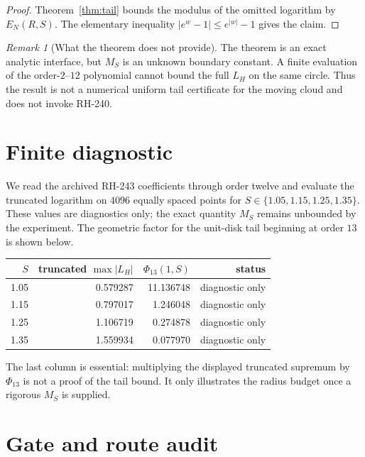 \documentclass[11pt]{article}
\theoremstyle{definition}
\theoremstyle{remark}
\newtheorem{remark}[theorem]{Remark}
\begin{document}
\begin{proof}
Theorem~\ref{thm:tail} bounds the modulus of the omitted logarithm by
$E_N(R,S)$.  The elementary inequality $|e^w-1|\le e^{|w|}-1$ gives the
claim.
\end{proof}

\begin{remark}[What the theorem does not provide]
The theorem is an exact analytic interface, but $M_S$ is an unknown boundary
constant.  A finite evaluation of the order-$2$--$12$ polynomial cannot bound
the full $L_H$ on the same circle.  Thus the result is not a numerical
uniform tail certificate for the moving cloud and does not invoke RH-240.
\end{remark}

\section{Finite diagnostic}

We read the archived RH-243 coefficients through order twelve and evaluate
the truncated logarithm on $4096$ equally spaced points for
$S\in\{1.05,1.15,1.25,1.35\}$.  These values are diagnostics only; the exact
quantity $M_S$ remains unbounded by the experiment.  The geometric factor for
the unit-disk tail beginning at order $13$ is shown below.

\begin{center}
\small
\begin{tabular}{rrrr}
\toprule
$S$ & truncated $\max|L_H|$ & $\Phi_{13}(1,S)$ & status\\
\midrule
1.05 & 0.579287 & 11.136748 & diagnostic only\\
1.15 & 0.797017 & 1.246048 & diagnostic only\\
1.25 & 1.106719 & 0.274878 & diagnostic only\\
1.35 & 1.559934 & 0.077970 & diagnostic only\\
\bottomrule
\end{tabular}
\end{center}

The last column is essential: multiplying the displayed truncated supremum by
$\Phi_{13}$ is not a proof of the tail bound.  It only illustrates the radius
budget once a rigorous $M_S$ is supplied.

\section{Gate and route audit}
\end{document}
